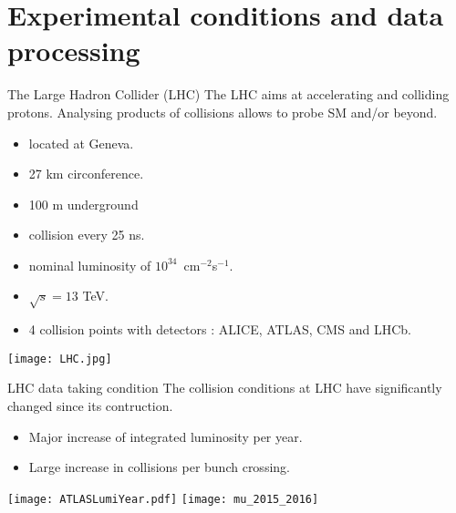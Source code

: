 \section{Experimental conditions and data processing}
\frame{\tableofcontents[currentsection]}

\begin{frame}{The Large Hadron Collider (LHC)}
  The LHC aims at accelerating and colliding protons.
  Analysing products of collisions allows to probe SM and/or beyond.
  \vfill
  
  \begin{minipage}{0.49\linewidth}
    \begin{itemize}
    \item located at Geneva.
    \item 27 km circonference.
    \item 100 m underground
    \item collision every 25 ns.
    \item nominal luminosity of $10^{34}$~cm$^{-2}$s$^{-1}$.
    \item $\sqrt{s}=13$ TeV.
    \item 4 collision points with detectors : ALICE, ATLAS, CMS and LHCb.
    \end{itemize}
    \end{minipage}
  \hfill
  \begin{minipage}{0.49\linewidth}
    \texttt{[image: LHC.jpg]}
    \end{minipage}
\end{frame}
\begin{frame}{LHC data taking condition}
  The collision conditions at LHC have significantly changed since its contruction.
  \begin{itemize}
  \item Major increase of integrated luminosity per year.
  \item Large increase in collisions per bunch crossing.
  \end{itemize}

  \begin{center} \texttt{[image: ATLASLumiYear.pdf]}
  \texttt{[image: mu\_2015\_2016]} \end{center}
\end{frame}
